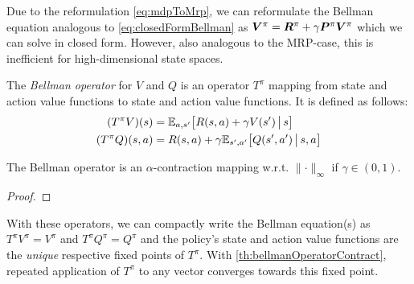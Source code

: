 				Due to the reformulation \eqref{eq:mdpToMrp}, we can reformulate the Bellman equation analogous to \eqref{eq:closedFormBellman} as \( \bm{V}^\pi = \bm{R}^\pi + \gamma \bm{P}^\pi \bm{V}^\pi \) which we can solve in closed form. However, also analogous to the \ac{MRP}-case, this is inefficient for high-dimensional state spaces.

				\begin{definition}  \label{def:bellmanOperator}
					The \emph{Bellman operator} for \(V\) and \(Q\) is an operator \(T^\pi\) mapping from state and action value functions to state and action value functions. It is defined as follows:
					\begin{align}
						(T^\pi V)(s) &= \mathbb{E}_{a, s'}\bigl[ R(s, a) + \gamma V(s') \,\big\vert\, s \bigr] \\
						(T^\pi Q)(s, a) &= R(s, a) + \gamma \mathbb{E}_{s', a'} \bigl[ Q(s', a') \,\big\vert\, s, a \bigr]
					\end{align}
				\end{definition}
				\begin{theorem}  \label{th:bellmanOperatorContract}
					The Bellman operator is an \(\alpha\)-contraction mapping w.r.t. \( \lVert \cdot \rVert_\infty \) if \( \gamma \in (0, 1) \).
				\end{theorem}
				\begin{proof}
				\end{proof}
				\begin{remark}
					With these operators, we can compactly write the Bellman equation(s) as \( T^\pi V^\pi = V^\pi \) and \( T^\pi Q^\pi = Q^\pi \) and the policy's state and action value functions are the \emph{unique} respective fixed points of \(T^\pi\). With \autoref{th:bellmanOperatorContract}, repeated application of \(T^\pi\) to any vector converges towards this fixed point.
				\end{remark}


